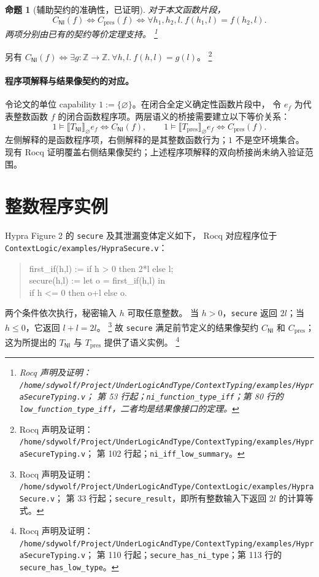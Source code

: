 \documentclass[UTF8,a4paper,11pt,fontset=fandol]{ctexart}
\newcommand{\NI}{\mathsf{NI}}
\newcommand{\Den}[1]{\llbracket #1\rrbracket}
\newcommand{\rocqnote}[3]{%
  \footnote{Rocq 声明及证明：
  \nolinkurl{/home/sdywolf/Project/UnderLogicAndType/#1}；
  第 #2 行起；#3。}}
\newtheorem{proposition}[definition]{命题}
\begin{document}
\begin{proposition}[辅助契约的准确性，已证明]
对于本文函数片段，
\[
 C_{\NI}(f)\Longleftrightarrow C_{\mathrm{pres}}(f)
 \Longleftrightarrow\forall h_1,h_2,l.\ f(h_1,l)=f(h_2,l).
\]
两项分别由已有的契约等价定理支持。\rocqnote{ContextTyping/examples/HypraSecureTyping.v}{53}{\texttt{ni\_function\_type\_iff}；第 80 行的 \texttt{low\_function\_type\_iff}，二者均是结果像接口的定理}
\end{proposition}
另有 $C_{\NI}(f)\Longleftrightarrow\exists g:\mathbb Z\to\mathbb Z.\ \forall h,l.\ f(h,l)=g(l)$。\rocqnote{ContextTyping/examples/HypraSecureTyping.v}{102}{\texttt{ni\_iff\_low\_summary}}

\paragraph{程序项解释与结果像契约的对应。}
令论文的单位 capability $1:=\{\varnothing\}$。在闭合全定义确定性函数片段中，
令 $e_f$ 为代表整数函数 $f$ 的闭合函数程序项。两层语义的桥接需要建立以下等价关系：
\[
 1\models\Den{T_{\NI}}_{\varnothing}e_f
 \Longleftrightarrow C_{\NI}(f),\qquad
 1\models\Den{T_{\mathrm{pres}}}_{\varnothing}e_f
 \Longleftrightarrow C_{\mathrm{pres}}(f).
\]
左侧解释的是函数程序项，右侧解释的是其整数函数行为；$1$ 不是空环境集合。
现有 Rocq 证明覆盖右侧结果像契约；上述程序项解释的双向桥接尚未纳入验证范围。
\section{整数程序实例}

Hypra Figure 2 的 \texttt{secure}\cite{hypra} 及其泄漏变体定义如下，
Rocq 对应程序位于 \nolinkurl{ContextLogic/examples/HypraSecure.v}：
\begin{quote}\ttfamily
first\_if(h,l) := if h > 0 then 2*l else l;\\
secure(h,l) := let o = first\_if(h,l) in\\
\phantom{secure(h,l) := }if h <= 0 then o+l else o.
\end{quote}
两个条件依次执行，秘密输入 $h$ 可取任意整数。
当 $h>0$，\texttt{secure} 返回 $2l$；当 $h\le0$，它返回 $l+l=2l$。\rocqnote{ContextLogic/examples/HypraSecure.v}{33}{\texttt{secure\_result}，即所有整数输入下返回 $2l$ 的计算等式}
故 \texttt{secure} 满足前节定义的结果像契约 $C_{\NI}$ 和 $C_{\mathrm{pres}}$；这为所提出的 $T_{\NI}$ 与 $T_{\mathrm{pres}}$ 提供了语义实例。\rocqnote{ContextTyping/examples/HypraSecureTyping.v}{110}{\texttt{secure\_has\_ni\_type}；第 113 行的 \texttt{secure\_has\_low\_type}}
\end{document}
